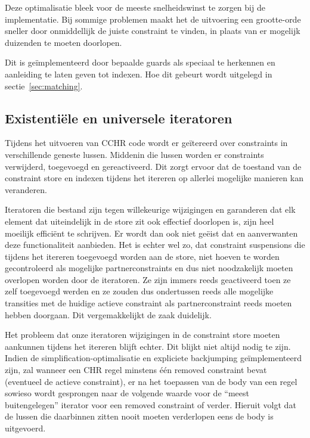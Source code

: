 {Deze optimalisatie bleek voor de meeste snelheidswinst te zorgen bij de implementatie. Bij sommige problemen maakt het de uitvoering een grootte-orde sneller door onmiddellijk de juiste constraint te vinden, in plaats van er mogelijk duizenden te moeten doorlopen.

Dit is ge\"implementeerd door bepaalde guards als speciaal te herkennen en aanleiding te laten geven tot indexen. Hoe dit gebeurt wordt uitgelegd in sectie~\ref{sec:matching}.
 
\subsection{Existenti\"ele en universele iteratoren} \label{sec:gencode-iter}

Tijdens het uitvoeren van CCHR code wordt er ge\"itereerd over constraints in verschillende geneste lussen. Middenin die lussen worden er constraints verwijderd, toegevoegd en gereactiveerd. Dit zorgt ervoor dat de toestand van de constraint store en indexen tijdens het itereren op allerlei mogelijke manieren kan veranderen.

Iteratoren die bestand zijn tegen willekeurige wijzigingen en garanderen dat elk element dat uiteindelijk in de store zit ook effectief doorlopen is, zijn heel moeilijk effici\"ent te schrijven. Er wordt dan ook niet ge\"eist dat  en aanverwanten deze functionaliteit aanbieden. Het is echter wel zo, dat constraint suspensions die tijdens het itereren toegevoegd worden aan de store, niet hoeven te worden gecontroleerd als mogelijke partnerconstraints en dus niet noodzakelijk moeten overlopen worden door de iteratoren. Ze zijn immers reeds geactiveerd toen ze zelf toegevoegd werden en ze zouden dus ondertussen reeds alle mogelijke transities met de huidige actieve constraint als partnerconstraint reeds moeten hebben doorgaan. Dit vergemakkelijkt de zaak duidelijk.

Het probleem dat onze iteratoren wijzigingen in de constraint store moeten aankunnen tijdens het itereren blijft echter. Dit blijkt niet altijd nodig te zijn. Indien de simplification-optimalisatie en expliciete backjumping ge\"implementeerd zijn, zal wanneer een CHR regel minstens \'e\'en removed constraint bevat (eventueel de actieve constraint), er na het toepassen van de body van een regel sowieso wordt gesprongen naar de volgende waarde voor de ``meest buitengelegen'' iterator voor een removed constraint of verder. Hieruit volgt dat de lussen die daarbinnen zitten nooit moeten verderlopen eens de body is uitgevoerd.

}
